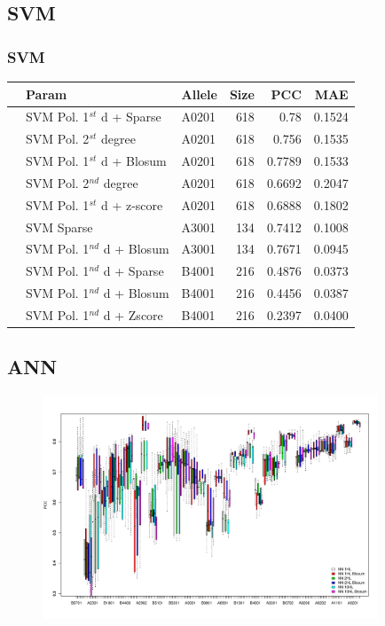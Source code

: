 \documentclass[presentation]{beamer}   %
\begin{document}
\subsection{SVM}
 \frametitle{SVM}
\begin{frame}
\begin{table}[ht]\scriptsize
\begin{center}
\begin{tabular}{rllrrr}
  \hline
 & Param & Allele & Size & PCC & MAE \\ 
  \hline
 & SVM Pol. 1$^{st}$ d + Sparse & A0201 &   618 & 0.78 & 0.1524 \\ 
 & SVM Pol. 2$^{st}$ degree & A0201 &   618 & 0.756 & 0.1535 \\ 
 & SVM Pol. 1$^{st}$ d + Blosum & A0201 &   618 & 0.7789 & 0.1533 \\ 
 & SVM Pol. 2$^{nd}$ degree & A0201 &   618 & 0.6692 & 0.2047 \\ 
 & SVM Pol. 1$^{st}$ d + z-score & A0201 &   618 & 0.6888 & 0.1802 \\ 
 & SVM Sparse & A3001 &   134 & 0.7412 & 0.1008 \\ 
 & SVM Pol. 1$^{nd}$ d + Blosum & A3001 &   134 & 0.7671 & 0.0945 \\ 
 & SVM Pol. 1$^{nd}$ d + Sparse & B4001 &   216 & 0.4876 & 0.0373 \\ 
 & SVM Pol. 1$^{nd}$ d + Blosum & B4001 &   216 & 0.4456 & 0.0387 \\ 
 & SVM Pol. 1$^{nd}$ d + Zscore & B4001 &   216 & 0.2397 & 0.0400 \\ 
   \hline
\end{tabular}
\end{center}
\end{table}

\end{frame}

\subsection{ANN}
\begin{frame}
\begin{figure}[ht]
\begin{center}
\includegraphics[width=10cm]{fig/annBX1.pdf}
\end{center}
\end{figure}
\end{frame}
\end{document}

